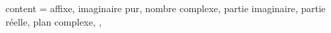 {
  content = {
    affixe,
    imaginaire pur,
    nombre complexe,
    partie imaginaire,
    partie réelle,
    plan complexe,
  },
}
\endinput
bla blab \bla